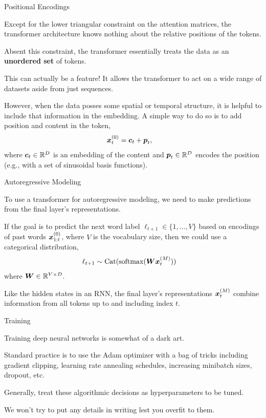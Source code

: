 \documentclass[aspectratio=169]{beamer}
\begin{document}
\begin{frame}[t,allowframebreaks]{Positional Encodings}\label{positional-encodings}

Except for the lower triangular constraint on the attention matrices,
the transformer architecture knows nothing about the relative positions
of the tokens. 

Absent this constraint, the transformer essentially
treats the data as an \textbf{unordered set} of tokens. 

This can actually be a feature! It allows the transformer to act on a wide range
of datasets aside from just sequences. 

However, when the data posses some spatial or temporal structure, it is
helpful to include that information in the embedding. A simple way to do
so is to add position and content in the token, 
\begin{align*}
\boldsymbol{x}_t^{(0)} &= \boldsymbol{c}_t + \boldsymbol{p}_t,
\end{align*} 
where \(\boldsymbol{c}_t \in \mathbb{R}^D\) is an embedding of the content and \(\boldsymbol{p}_t \in \mathbb{R}^D\) encodes the position (e.g., with a
set of sinusoidal basis functions).
\end{frame}

\begin{frame}[t,allowframebreaks]{Autoregressive Modeling}\label{autoregressive-modeling}

To use a transformer for autoregressive modeling, we need to make
predictions from the final layer's representations. 

If the goal is to predict the next word label \(\ell_{t+1} \in \{1,\ldots,V\}\) 
based on encodings of past words \(\boldsymbol{x}_{1:t}^{(0)}\), where \(V\) is the
vocabulary size, then we could use a categorical distribution,
\begin{align*}
\ell_{t+1} &\sim \mathrm{Cat}(\mathrm{softmax}(\boldsymbol{W} \boldsymbol{x}_t^{(M)}))
\end{align*} 
where \(\boldsymbol{W} \in \mathbb{R}^{V \times D}\). 

Like the hidden states in an RNN, the final layer's representations \(\boldsymbol{x}_t^{(M)}\)
combine information from all tokens up to and including index \(t\).
\end{frame}

\begin{frame}[t,allowframebreaks]{Training}\label{training}

Training deep neural networks is somewhat of a dark art. 

Standard practice is to use the Adam optimizer with a bag of tricks including
gradient clipping, learning rate annealing schedules, increasing
minibatch sizes, dropout, etc. 

Generally, treat these algorithmic decisions as hyperparameters to be tuned. 

We won't try to put any details in writing lest you overfit to them.
\end{frame}
\end{document}
